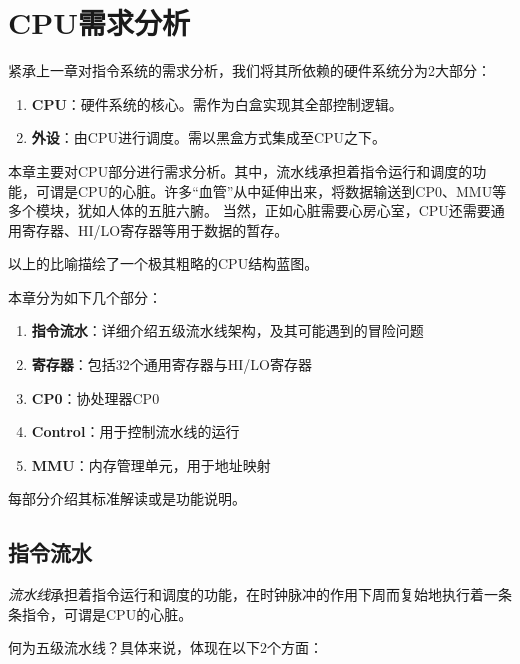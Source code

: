 \chapter{CPU需求分析}

紧承上一章对指令系统的需求分析，我们将其所依赖的硬件系统分为2大部分：

\begin{enumerate}
    \item {\bf CPU}：硬件系统的核心。需作为白盒实现其全部控制逻辑。
    \item {\bf 外设}：由CPU进行调度。需以黑盒方式集成至CPU之下。
\end{enumerate}

本章主要对CPU部分进行需求分析。其中，流水线承担着指令运行和调度的功能，可谓是CPU的心脏。许多``血管''从中延伸出来，将数据输送到CP0、MMU等多个模块，犹如人体的五脏六腑。
当然，正如心脏需要心房心室，CPU还需要通用寄存器、HI/LO寄存器等用于数据的暂存。

以上的比喻描绘了一个极其粗略的CPU结构蓝图。

本章分为如下几个部分：

\begin{enumerate}
    \item {\bf 指令流水}：详细介绍五级流水线架构，及其可能遇到的冒险问题
    \item {\bf 寄存器}：包括32个通用寄存器与HI/LO寄存器
    \item {\bf CP0}：协处理器CP0
    \item {\bf Control}：用于控制流水线的运行
    \item {\bf MMU}：内存管理单元，用于地址映射
\end{enumerate}

每部分介绍其标准解读或是功能说明。

\section{指令流水}

\emph{流水线}承担着指令运行和调度的功能，在时钟脉冲的作用下周而复始地执行着一条条指令，可谓是CPU的心脏。

何为五级流水线？具体来说，体现在以下2个方面：

